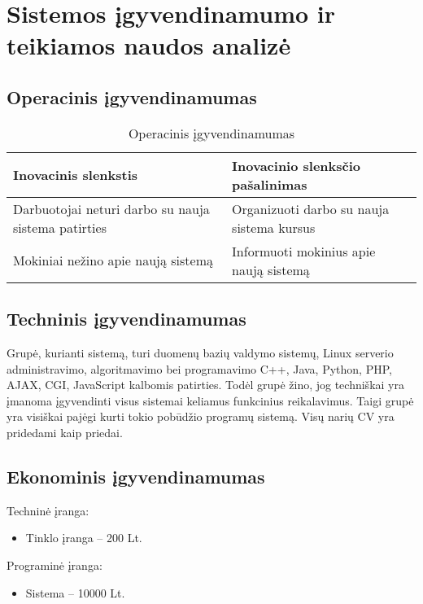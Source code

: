 \chapter{Sistemos \k{i}gyvendinamumo ir teikiamos naudos analiz\.{e}}

\section{Operacinis \k{i}gyvendinamumas}

\begin{table}[h!]
  \centering
  \begin{tabular}{|p{5cm}|p{5cm}|}
  \hline 
  Inovacinis slenkstis & Inovacinio slenks\v{c}io pašalinimas\tabularnewline
  \hline 
  Darbuotojai neturi darbo su nauja sistema patirties & Organizuoti darbo su nauja sistema kursus\tabularnewline
  \hline 
  Mokiniai nežino apie nauj\k{a} sistem\k{a} & Informuoti mokinius apie nauj\k{a} sistem\k{a}\tabularnewline
  \hline
  \end{tabular}
  \caption{Operacinis įgyvendinamumas}
  \label{tab:igyv_oper}
\end{table}

\section{Techninis \k{i}gyvendinamumas}

Grupė, kurianti sistemą, turi duomenų bazių valdymo sistemų,
Linux serverio administravimo, algoritmavimo bei programavimo 
C++, Java, Python, PHP, AJAX, CGI, JavaScript kalbomis patirties.
Todėl grupė žino, jog techniškai yra įmanoma įgyvendinti visus sistemai 
keliamus funkcinius reikalavimus. Taigi
grup\.{e} yra visiškai paj\.{e}gi kurti tokio pob\={u}džio program\k{u}
sistem\k{a}. Vis\k{u} nari\k{u} CV yra pridedami kaip priedai. 

\section{Ekonominis \k{i}gyvendinamumas}

Technin\.{e} \k{i}ranga:
\begin{itemize}
  \item Tinklo \k{i}ranga – 200 Lt.
\end{itemize}

Programin\.{e} \k{i}ranga:
\begin{itemize}
  \item Sistema – 10000 Lt.
\end{itemize}

